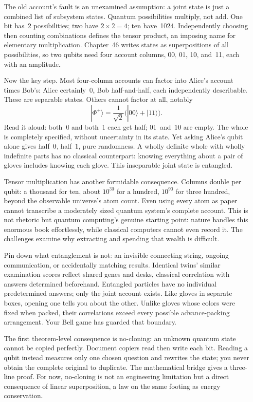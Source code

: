 
The old account's fault is an unexamined assumption: a joint state is just a combined list of subsystem states. Quantum possibilities multiply, not add. One bit has~2 possibilities; two have \(2\times2=4\); ten have~1024. Independently choosing then counting combinations defines the tensor product, an imposing name for elementary multiplication. Chapter~46 writes states as superpositions of all possibilities, so two qubits need four account columns, 00, 01, 10, and~11, each with an amplitude.

Now the key step. Most four-column accounts can factor into Alice's account times Bob's: Alice certainly~0, Bob half-and-half, each independently describable. These are separable states. Others cannot factor at all, notably
\[
|\Phi^{+}\rangle=\frac{1}{\sqrt2}\big(|00\rangle+|11\rangle\big).
\]
Read it aloud: both~0 and both~1 each get half; 01~and~10 are empty. The whole is completely specified, without uncertainty in its state. Yet asking Alice's qubit alone gives half~0, half~1, pure randomness. A wholly definite whole with wholly indefinite parts has no classical counterpart: knowing everything about a pair of gloves includes knowing each glove. This inseparable joint state is entangled.

Tensor multiplication has another formidable consequence. Columns double per qubit: a thousand for ten, about \(10^{30}\) for a hundred, \(10^{90}\) for three hundred, beyond the observable universe's atom count. Even using every atom as paper cannot transcribe a moderately sized quantum system's complete account. This is not rhetoric but quantum computing's genuine starting point: nature handles this enormous book effortlessly, while classical computers cannot even record it. The challenges examine why extracting and spending that wealth is difficult.

Pin down what entanglement is not: an invisible connecting string, ongoing communication, or accidentally matching results. Identical twins' similar examination scores reflect shared genes and desks, classical correlation with answers determined beforehand. Entangled particles have no individual predetermined answers; only the joint account exists. Like gloves in separate boxes, opening one tells you about the other. Unlike gloves whose colors were fixed when packed, their correlations exceed every possible advance-packing arrangement. Your Bell game has guarded that boundary.

The first theorem-level consequence is no-cloning: an unknown quantum state cannot be copied perfectly. Document copiers read then write each bit. Reading a qubit instead measures only one chosen question and rewrites the state; you never obtain the complete original to duplicate. The mathematical bridge gives a three-line proof. For now, no-cloning is not an engineering limitation but a direct consequence of linear superposition, a law on the same footing as energy conservation.

